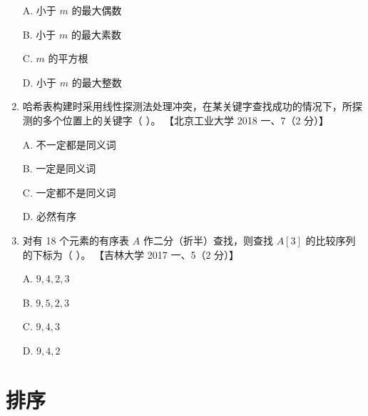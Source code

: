 \documentclass[lang=cn,newtx,10pt,scheme=chinese]{elegantbook}
\begin{document}
\begin{enumerate}
    A. 小于 $m$ 的最大偶数  

    B. 小于 $m$ 的最大素数  

    C. $m$ 的平方根  

    D. 小于 $m$ 的最大整数  

    \item 哈希表构建时采用线性探测法处理冲突，在某关键字查找成功的情况下，所探测的多个位置上的关键字（ ）。  
    【北京工业大学 2018 一、7（2 分）】  

    A. 不一定都是同义词  

    B. 一定是同义词  

    C. 一定都不是同义词  

    D. 必然有序  

    \item 对有 18 个元素的有序表 $A$ 作二分（折半）查找，则查找 $A[3]$ 的比较序列的下标为（ ）。  
    【吉林大学 2017 一、5（2 分）】  

    A. $9, 4, 2, 3$  

    B. $9, 5, 2, 3$  

    C. $9, 4, 3$  

    D. $9, 4, 2$  

\end{enumerate}

\chapter{排序}
\end{document}
